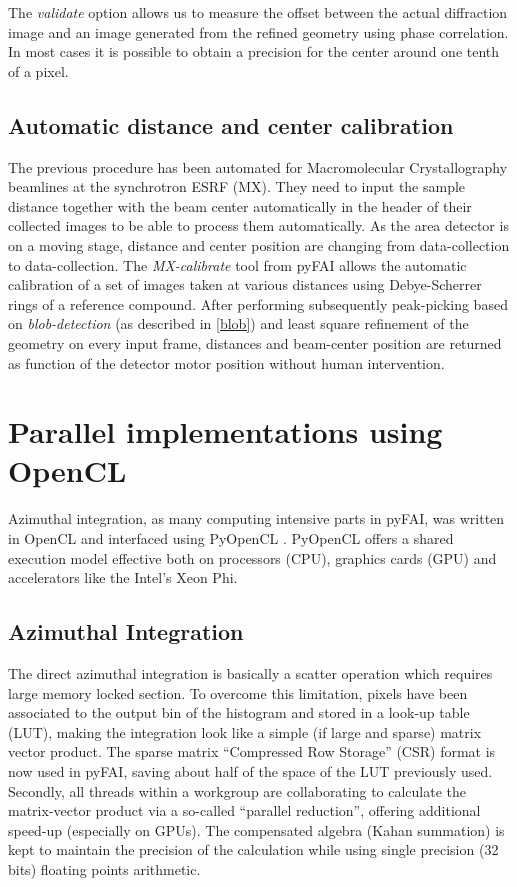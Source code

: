 \documentclass[preprint]{iucr}
\begin{document}
The \textit{validate} option allows us to measure the offset between the actual
diffraction image and an image generated from the refined geometry using phase
correlation. In most cases it is possible to obtain a precision for the
center around one tenth of a pixel.

\subsection{Automatic distance and center calibration}
The previous procedure has been automated for Macromolecular Crystallography
beamlines at the synchrotron ESRF (MX). They need to input the sample
distance together  with the beam center automatically in the header of their
collected images to be able to process them automatically.
As the area detector is on a moving stage, distance and center position are
changing from data-collection to data-collection.
The \textit{MX-calibrate} tool from pyFAI allows the automatic calibration of
a set of images taken at various distances using Debye-Scherrer rings of a
reference compound.
After performing subsequently peak-picking based on \textit{blob-detection}
(as described in \ref{blob}) and least square refinement of the geometry on
every input frame, distances and beam-center position are returned as function
of the detector motor position without human intervention.

\section{Parallel implementations using OpenCL}

Azimuthal integration, as  many computing intensive parts in pyFAI, was written
in OpenCL and interfaced using PyOpenCL \cite{pyopencl}. PyOpenCL offers a
shared execution model effective both on processors (CPU), graphics cards (GPU)
and accelerators like the Intel's Xeon Phi.

\subsection{Azimuthal Integration}
The direct azimuthal integration is basically a scatter operation which
requires large memory locked section.
To overcome this limitation, pixels have been
associated to the output bin of the histogram and stored in a look-up
table (LUT), making the integration look like a simple (if large and sparse)
matrix vector product.
The sparse matrix ``Compressed Row Storage'' (CSR) format is now used in pyFAI,
saving about half of the space of the LUT previously used.
Secondly, all threads within a workgroup are collaborating to calculate the
matrix-vector product via a so-called ``parallel reduction'', offering
additional speed-up (especially on GPUs).
The compensated algebra (Kahan summation) is kept to maintain the precision
of the calculation while using single precision (32 bits) floating points
arithmetic.
\end{document}
